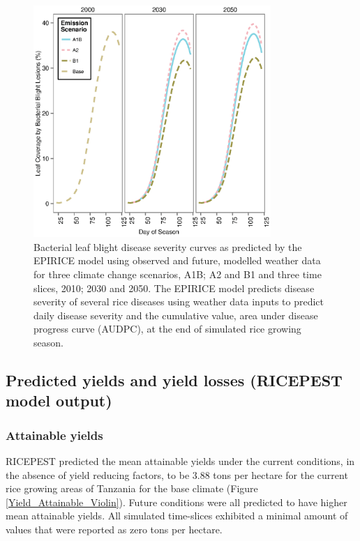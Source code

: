 \documentclass[preprint,12pt]{elsarticle}
\begin{document}
\begin{figure}[H]
  \includegraphics[width = 90mm]{figures/BB}
  \caption{Bacterial leaf blight disease severity curves as predicted by the EPIRICE model using observed and future, modelled weather data for three climate change scenarios, A1B; A2 and B1 and three time slices, 2010; 2030 and 2050. The EPIRICE model predicts disease severity of several rice diseases using weather data inputs to predict daily disease severity and the cumulative value, area under disease progress curve (AUDPC), at the end of simulated rice growing season.}
    \label{BBCurves}
\end{figure}

\subsection{Predicted yields and yield losses (RICEPEST model output)}
\subsubsection{Attainable yields}
RICEPEST predicted the mean attainable yields under the current conditions, in the absence of yield reducing factors, to be 3.88 tons per hectare for the current rice growing areas of Tanzania for the base climate (Figure \ref{Yield_Attainable_Violin}). Future conditions were all predicted to have higher mean attainable yields. All simulated time-slices exhibited a minimal amount of values that were reported as zero tons per hectare.
\end{document}
